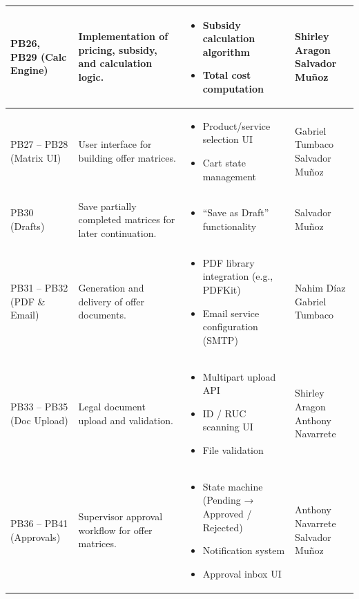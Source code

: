 \documentclass[letterpaper%
, oneside%
, 12pt%
, memoireprojet%
, english%
,creativecommons,hyperref, withAlgo2e %
]{thETS}
\begin{document}
\begin{longtable}{|
p{3.0cm}|
p{4.6cm}|
p{5.6cm}|
p{3.0cm}|
}
PB26, PB29 (Calc Engine) &
Implementation of pricing, subsidy, and calculation logic. &
\begin{itemize}\setlength{\itemsep}{2pt}
\item Subsidy calculation algorithm
\item Total cost computation
\end{itemize} &
Shirley Aragon \newline
Salvador Muñoz \\ \hline

PB27 -- PB28 (Matrix UI) &
User interface for building offer matrices. &
\begin{itemize}\setlength{\itemsep}{2pt}
\item Product/service selection UI
\item Cart state management
\end{itemize} &
Gabriel Tumbaco \newline
Salvador Muñoz \\ \hline

PB30 (Drafts) &
Save partially completed matrices for later continuation. &
\begin{itemize}\setlength{\itemsep}{2pt}
\item ``Save as Draft'' functionality
\end{itemize} &
Salvador Muñoz \\ \hline

PB31 -- PB32 (PDF \& Email) &
Generation and delivery of offer documents. &
\begin{itemize}\setlength{\itemsep}{2pt}
\item PDF library integration (e.g., PDFKit)
\item Email service configuration (SMTP)
\end{itemize} &
Nahim Díaz \newline
Gabriel Tumbaco \\ \hline

PB33 -- PB35 (Doc Upload) &
Legal document upload and validation. &
\begin{itemize}\setlength{\itemsep}{2pt}
\item Multipart upload API
\item ID / RUC scanning UI
\item File validation
\end{itemize} &
Shirley Aragon \newline
Anthony Navarrete \\ \hline

PB36 -- PB41 (Approvals) &
Supervisor approval workflow for offer matrices. &
\begin{itemize}\setlength{\itemsep}{2pt}
\item State machine (Pending → Approved / Rejected)
\item Notification system
\item Approval inbox UI
\end{itemize} &
Anthony Navarrete \newline
Salvador Muñoz \\ \hline


\end{longtable}
\end{document}
